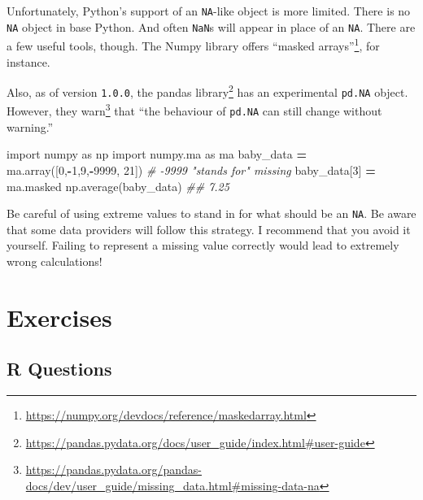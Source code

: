 \documentclass[
  12pt,
]{krantz}
\makeatletter
\newenvironment{Shaded}{\begin{snugshade}}{\end{snugshade}}
\newcommand{\CommentTok}[1]{\textcolor[rgb]{0.37,0.37,0.37}{\textit{#1}}}
\newcommand{\DecValTok}[1]{\textcolor[rgb]{0.06,0.06,0.06}{#1}}
\newcommand{\ImportTok}[1]{#1}
\newcommand{\NormalTok}[1]{#1}
\newcommand{\OperatorTok}[1]{\textcolor[rgb]{0.43,0.43,0.43}{\textbf{#1}}}
\renewcommand{\href}[2]{#2\footnote{\url{#1}}}
\newenvironment{kframe}{%
\medskip{}
\setlength{\fboxsep}{.8em}
 \def\at@end@of@kframe{}%
 \ifinner\ifhmode%
  \def\at@end@of@kframe{\end{minipage}}%
  \begin{minipage}{\columnwidth}%
 \fi\fi%
 \def\FrameCommand##1{\hskip\@totalleftmargin \hskip-\fboxsep
 \colorbox{shadecolor}{##1}\hskip-\fboxsep
     \hskip-\linewidth \hskip-\@totalleftmargin \hskip\columnwidth}%
 \MakeFramed {\advance\hsize-\width
   \@totalleftmargin\z@ \linewidth\hsize
   \@setminipage}}%
 {\par\unskip\endMakeFramed%
 \at@end@of@kframe}
\renewenvironment{Shaded}{\begin{kframe}}{\end{kframe}}
\makeatother
\begin{document}
Unfortunately, Python's support of an \texttt{NA}-like object is more limited. There is no \texttt{NA} object in base Python. And often \texttt{NaN}s will appear in place of an \texttt{NA}. There are a few useful tools, though. The Numpy library offers \href{https://numpy.org/devdocs/reference/maskedarray.html}{``masked arrays''}, for instance.

Also, as of version \texttt{1.0.0}, the \href{https://pandas.pydata.org/docs/user_guide/index.html\#user-guide}{pandas library} has an experimental \texttt{pd.NA} object. However, they \href{https://pandas.pydata.org/pandas-docs/dev/user_guide/missing_data.html\#missing-data-na}{warn} that ``the behaviour of \texttt{pd.NA} can still change without warning.''

\begin{Shaded}
\begin{Highlighting}[]
\ImportTok{import}\NormalTok{ numpy }\ImportTok{as}\NormalTok{ np}
\ImportTok{import}\NormalTok{ numpy.ma }\ImportTok{as}\NormalTok{ ma}
\NormalTok{baby\_data }\OperatorTok{=}\NormalTok{ ma.array([}\DecValTok{0}\NormalTok{,}\OperatorTok{{-}}\DecValTok{1}\NormalTok{,}\DecValTok{9}\NormalTok{,}\OperatorTok{{-}}\DecValTok{9999}\NormalTok{, }\DecValTok{21}\NormalTok{]) }\CommentTok{\# {-}9999 "stands for" missing}
\NormalTok{baby\_data[}\DecValTok{3}\NormalTok{] }\OperatorTok{=}\NormalTok{ ma.masked}
\NormalTok{np.average(baby\_data)}
\CommentTok{\#\# 7.25}
\end{Highlighting}
\end{Shaded}

Be careful of using extreme values to stand in for what should be an \texttt{NA}. Be aware that some data providers will follow this strategy. I recommend that you avoid it yourself. Failing to represent a missing value correctly would lead to extremely wrong calculations!

\hypertarget{exercises-1}{%
\section{Exercises}\label{exercises-1}}

\hypertarget{r-questions-1}{%
\subsection{R Questions}\label{r-questions-1}}
\end{document}
